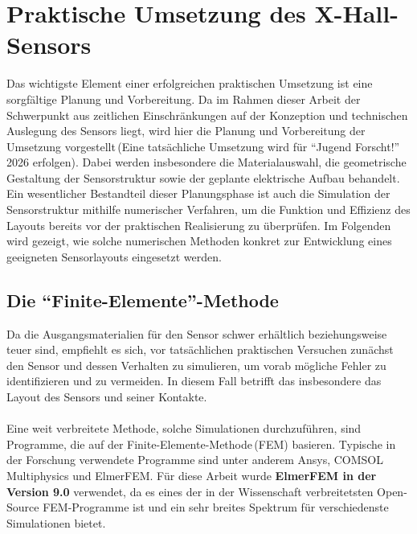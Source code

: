 \documentclass[12pt, a4paper]{article}
\begin{document}
\section{Praktische Umsetzung des X-Hall-Sensors}
Das wichtigste Element einer erfolgreichen praktischen Umsetzung ist eine sorgfältige Planung und Vorbereitung. Da im Rahmen dieser Arbeit der Schwerpunkt aus zeitlichen Einschränkungen auf der Konzeption und technischen Auslegung des Sensors liegt, wird hier die Planung und Vorbereitung der Umsetzung vorgestellt\,(Eine tatsächliche Umsetzung wird für ``Jugend Forscht!'' 2026 erfolgen). \newline
Dabei werden insbesondere die Materialauswahl, die geometrische Gestaltung der Sensorstruktur sowie der geplante elektrische Aufbau behandelt. Ein wesentlicher Bestandteil dieser Planungsphase ist auch die Simulation der Sensorstruktur mithilfe numerischer Verfahren, um die Funktion und Effizienz des Layouts bereits vor der praktischen Realisierung zu überprüfen. Im Folgenden wird gezeigt, wie solche numerischen Methoden konkret zur Entwicklung eines geeigneten Sensorlayouts eingesetzt werden.

\subsection{Die ``Finite-Elemente''-Methode}
Da die Ausgangsmaterialien für den Sensor schwer erhältlich beziehungsweise teuer sind, empfiehlt es sich, vor tatsächlichen praktischen Versuchen zunächst den Sensor und dessen Verhalten zu simulieren, um vorab mögliche Fehler zu identifizieren und zu vermeiden. \newline
In diesem Fall betrifft das insbesondere das Layout des Sensors und seiner Kontakte.\paragraph{}

Eine weit verbreitete Methode, solche Simulationen durchzuführen, sind Programme, die auf der Finite-Elemente-Methode\,(FEM) basieren. Typische in der Forschung verwendete Programme sind unter anderem Ansys, COMSOL Multiphysics und ElmerFEM.\newline
Für diese Arbeit wurde \textbf{ElmerFEM in der Version 9.0} verwendet, da es eines der in der Wissenschaft verbreitetsten Open-Source FEM-Programme ist und ein sehr breites Spektrum für verschiedenste Simulationen bietet.\paragraph{}
\end{document}

